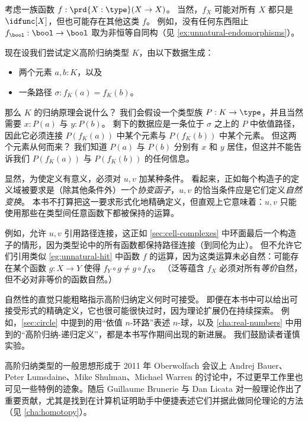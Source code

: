 \begin{eg}\label{eg:unnatural-hit}
  考虑一族函数 $f:\prd{X:\type} (X\to X)$。
  当然，$f_X$ 可能对所有 $X$ 都只是 $\idfunc[X]$，但也可能存在其他这类 $f$。
  例如，没有任何东西阻止 $f_{\bool}:\bool\to\bool$ 取为非恒等自同构（见 \cref{ex:unnatural-endomorphisms}）。

  现在设我们尝试定义高阶归纳类型 $K$，由以下数据生成：
  \begin{itemize}
  \item 两个元素 $a,b:K$，以及
  \item 一条路径 $\sigma:f_K(a)=f_K(b)$。
  \end{itemize}
  那么 $K$ 的归纳原理会说什么？
  我们会假设一个类型族 $P:K\to\type$，并且当然需要 $x:P(a)$ 与 $y:P(b)$。
  剩下的数据应是一条位于 $\sigma$ 之上的 $P$ 中依值路径，因此它必须连接 $P(f_K(a))$ 中某个元素与 $P(f_K(b))$ 中某个元素。
  但这两个元素从何而来？
  我们知道 $P(a)$ 与 $P(b)$ 分别有 $x$ 和 $y$ 居住，但这并不能告诉我们 $P(f_K(a))$ 与 $P(f_K(b))$ 的任何信息。
\end{eg}

显然，为使定义有意义，必须对 $u,v$ 加某种条件。
看起来，正如每个构造子的定义域被要求是（除其他条件外）一个\emph{协变函子}，$u,v$ 的恰当条件应是它们定义\emph{自然变换}。
本书不打算把这一要求形式化地精确定义，但直观上它意味着：$u,v$ 只能使用那些在类型间任意函数下都被保持的运算。

例如，允许 $u,v$ 引用路径连接，这正如 \cref{sec:cell-complexes} 中环面最后一个构造子的情形，因为类型论中的所有函数都保持路径连接（到同伦为止）。
但不允许它们引用类似 \cref{eg:unnatural-hit} 中函数 $f$ 的运算，因为这类运算未必自然：可能存在某个函数 $g:X\to Y$ 使得 $f_Y \circ g \neq g\circ f_X$。
（泛等蕴含 $f_X$ 必须对所有\emph{等价}自然，但不必对非等价的函数自然。）

自然性的直觉只能粗略指示高阶归纳定义何时可接受。
即便在本书中可以给出可接受形式的精确定义，它也很可能很快过时，因为理论扩展仍在持续探索。
例如，\cref{sec:circle} 中提到的用“依值 $n$-环路”表述 $n$-球，以及 \cref{cha:real-numbers} 中用到的“高阶归纳-递归定义”，都是本书写作期间出现的新进展。
我们鼓励读者谨慎实验。


\sectionNotes

高阶归纳类型的一般思想形成于 2011 年 Oberwolfach 会议上 Andrej Bauer、Peter Lumsdaine、Mike Shulman、Michael Warren 的讨论中，不过更早工作里也可见一些特例的迹象。随后 Guillaume Brunerie 与 Dan Licata 对一般理论作出了重要贡献，尤其是找到在计算机证明助手中便捷表述它们并据此做同伦理论的方法
（见 \cref{cha:homotopy}）。

